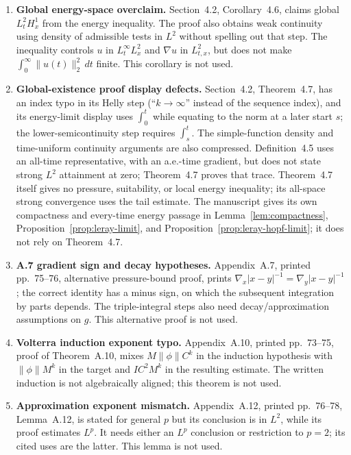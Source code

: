 \documentclass[11pt,reqno]{amsart}
\begin{document}
\begin{enumerate}
\item \textbf{Global energy-space overclaim.} Section~4.2, Corollary~4.6, claims global \(L^2_tH^1_x\) from the energy inequality. The proof also obtains weak continuity using density of admissible tests in \(L^2\) without spelling out that step. The inequality controls \(u\) in \(L^\infty_tL^2_x\) and \(\nabla u\) in \(L^2_{t,x}\), but does not make \(\int_0^\infty\|u(t)\|_2^2\,dt\) finite. This corollary is not used.

\item \textbf{Global-existence proof display defects.} Section~4.2, Theorem~4.7, has an index typo in its Helly step (“\(k\to\infty\)” instead of the sequence index), and its energy-limit display uses \(\int_0^t\) while equating to the norm at a later start \(s\); the lower-semicontinuity step requires \(\int_s^t\). The simple-function density and time-uniform continuity arguments are also compressed. Definition~4.5 uses an all-time representative, with an a.e.-time gradient, but does not state strong \(L^2\) attainment at zero; Theorem~4.7 proves that trace. Theorem~4.7 itself gives no pressure, suitability, or local energy inequality; its all-space strong convergence uses the tail estimate. The manuscript gives its own compactness and every-time energy passage in Lemma~\ref{lem:compactness}, Proposition~\ref{prop:leray-limit}, and Proposition~\ref{prop:leray-hopf-limit}; it does not rely on Theorem~4.7.

\item \textbf{A.7 gradient sign and decay hypotheses.} Appendix~A.7, printed pp.~75--76, alternative pressure-bound proof, prints \(\nabla_x|x-y|^{-1}=\nabla_y|x-y|^{-1}\); the correct identity has a minus sign, on which the subsequent integration by parts depends. The triple-integral steps also need decay/approximation assumptions on \(g\). This alternative proof is not used.

\item \textbf{Volterra induction exponent typo.} Appendix~A.10, printed pp.~73--75, proof of Theorem~A.10, mixes \(M\| \phi\| C^k\) in the induction hypothesis with \(\|\phi\|M^k\) in the target and \(IC^2M^k\) in the resulting estimate. The written induction is not algebraically aligned; this theorem is not used.

\item \textbf{Approximation exponent mismatch.} Appendix~A.12, printed pp.~76--78, Lemma~A.12, is stated for general \(p\) but its conclusion is in \(L^2\), while its proof estimates \(L^p\). It needs either an \(L^p\) conclusion or restriction to \(p=2\); its cited uses are the latter. This lemma is not used.


\end{enumerate}
\end{document}
